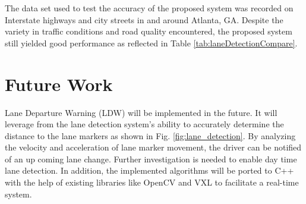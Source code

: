 \documentclass{article}
\begin{document}
The data set used to test the accuracy of the proposed system was recorded on Interstate highways and city streets in and around Atlanta, GA. Despite the variety in traffic conditions and road quality encountered, the proposed system still yielded good performance as reflected in Table \ref{tab:laneDetectionCompare}.

\section{Future Work}
\label{sec:print}
Lane Departure Warning (LDW) will be implemented in the future. It will leverage from the lane detection system's ability to accurately determine the distance to the lane markers as shown in Fig. \ref{fig:lane_detection}. By analyzing the velocity and acceleration of lane marker movement, the driver can be notified of an up coming lane change. Further investigation is needed to enable day time lane detection. In addition, the implemented algorithms will be ported to C++ with the help of existing libraries like OpenCV and VXL to facilitate a real-time system.

\small


\end{document}
